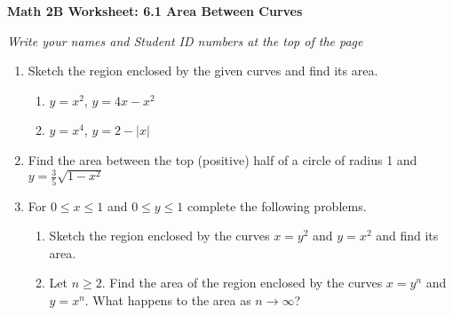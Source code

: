 \documentclass[12pt,fleqn]{article}
\begin{document}
\begin{center}
	\textbf{Math 2B Worksheet: 6.1 Area Between Curves}
\end{center}

\emph{Write your names and Student ID numbers at the top of the page}


\begin{enumerate}
\item Sketch the region enclosed by the given curves and find its area.
\begin{enumerate}
\item $y=x^2$, $y=4x-x^2$
\vfill



\item $y=x^4$, $y=2-|x|$
\end{enumerate}

\vfill

\newpage

\item  Find the area between the top (positive) half of a circle of radius 1 and $y=\displaystyle\frac{3}{5}\sqrt{1-x^2}$

\vfill

\item For $0\leq x\leq 1$ and $0\leq y\leq 1$ complete the following problems.
\begin{enumerate}  
	\item Sketch the region enclosed by the curves $x=y^2$ and $y=x^2$ and find its area.


	\vfill
	\item  Let $n\geq2$.  Find the area of the region enclosed by the curves $x=y^n$ and $y=x^n$.  What happens to the area as $n\to\infty$?  
\end{enumerate}
\end{enumerate}
\vfill
\end{document}
